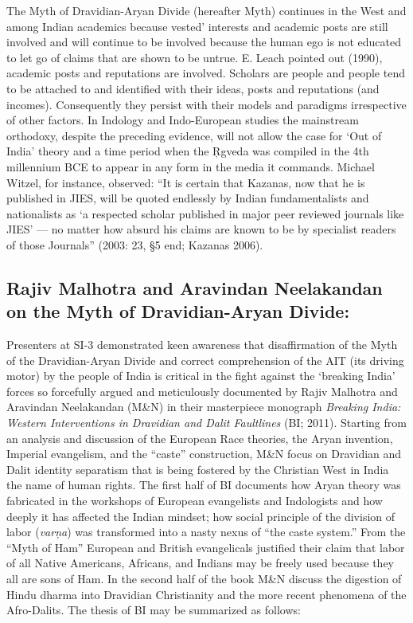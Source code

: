 The Myth of Dravidian-Aryan Divide (hereafter Myth) continues in the West and among Indian academics because vested’ interests and academic posts are still involved and will continue to be involved because the human ego is not educated to let go of claims that are shown to be untrue. E. Leach pointed out (1990), academic posts and reputations are involved. Scholars are people and people tend to be attached to and identified with their ideas, posts and reputations (and incomes). Consequently they persist with their models and paradigms irrespective of other factors. In Indology and Indo-European studies the mainstream orthodoxy, despite the preceding evidence, will not allow the case for ‘Out of India’ theory and a time period when the Ŗgveda was compiled in the 4th millennium BCE to appear in any form in the media it commands. Michael Witzel, for instance, observed: “It is certain that Kazanas, now that he is published in JIES, will be quoted endlessly by Indian fundamentalists and nationalists as ‘a respected scholar published in major peer reviewed journals like JIES’ — no matter how absurd his claims are known to be by specialist readers of those Journals” (2003: 23, §5 end; Kazanas 2006).

\subsection*{Rajiv Malhotra and Aravindan Neelakandan on the Myth of Dravidian-Aryan Divide:}

Presenters at SI-3 demonstrated keen awareness that disaffirmation of the Myth of the Dravidian-Aryan Divide and correct comprehension of the AIT (its driving motor) by the people of India is critical in the fight against the ‘breaking India’ forces so forcefully argued and meticulously documented by Rajiv Malhotra and Aravindan Neelakandan (M\&N) in their masterpiece monograph \textit{Breaking India: Western Interventions in Dravidian and Dalit Faultlines} (BI; 2011). Starting from an analysis and discussion of the European Race theories, the Aryan invention, Imperial evangelism, and the “caste” construction, M\&N focus on Dravidian and Dalit identity separatism that is being fostered by the Christian West in India the name of human rights. The first half of BI documents how Aryan theory was fabricated in the workshops of European evangelists and Indologists and how deeply it has affected the Indian mindset; how social principle of the division of labor (\textit{varņa}) was transformed into a nasty nexus of “the caste system.” From the “Myth of Ham” European and British evangelicals justified their claim that labor of all Native Americans, Africans, and Indians may be freely used because they all are sons of Ham. In the second half of the book M\&N discuss the digestion of Hindu dharma into Dravidian Christianity and the more recent phenomena of the Afro-Dalits. The thesis of BI may be summarized as follows:


